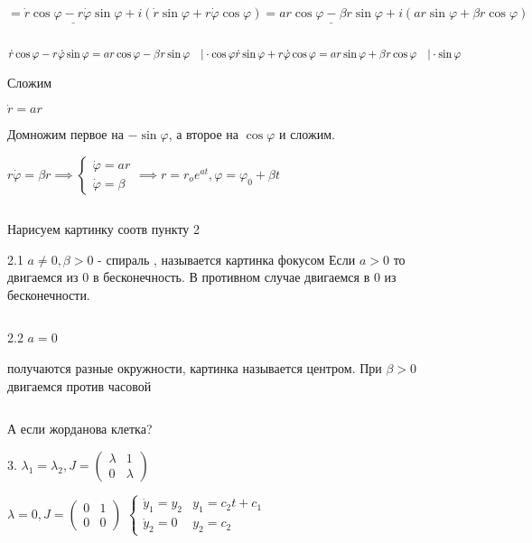 \documentclass[12pt, a4paper]{article}
\begin{document}
    $ = \underline{\dot r \cos\varphi - r\dot\varphi \sin \varphi} + 
    i(\dot r\sin\varphi + r \dot \varphi \cos\varphi) = 
    \underline{ar\cos\varphi - \beta r\sin\varphi} + 
    i(ar\sin\varphi + \beta r\cos\varphi)$

    \par $ $

    $\dot r \cos\varphi - r \dot \varphi \sin \varphi = ar\cos\varphi - \beta r \sin\varphi \quad| \cdot \cos\varphi \\
    \dot r \sin\varphi + r\dot \varphi \cos\varphi = ar\sin\varphi + \beta r\cos\varphi \quad| \cdot \sin\varphi$

    Сложим

    $\dot r = ar$

    Домножим первое на $-\sin\varphi$, а второе на $\cos\varphi$ и сложим.

    $r\dot\varphi = \beta r \implies
    \begin{cases}
        \dot \varphi = ar \\ \dot \varphi = \beta
    \end{cases} \implies r = r_o e^{at}, \varphi = \varphi_0 + \beta t$

    \par $ $

    Нарисуем картинку соотв пункту 2

    2.1 $a \neq 0, \beta > 0$ - спираль%
    , называется картинка фокусом 
    Если $a > 0$ то двигаемся из 0 в бесконечность.
    В противном случае двигаемся в 0 из бесконечности.
    
    \par $ $
    
    2.2 $ a = 0 $ 

    получаются разные окружности, картинка называется центром.
    При $\beta > 0$ двигаемся против часовой
    
    \par $ $

    А если жорданова клетка?

    3. $\lambda_1 = \lambda_2, J = \begin{pmatrix}
        \lambda & 1 \\ 0 & \lambda
    \end{pmatrix}$

     $\lambda=0, J = \begin{pmatrix}
        0 & 1 \\ 0& 0
    \end{pmatrix}$
    $\begin{cases}
        \dot y_1 = y_2 & y_1 = c_2 t + c_1 \\
        \dot y_2 = 0 & y_2 = c_2    
    \end{cases}
    $
\end{document}
